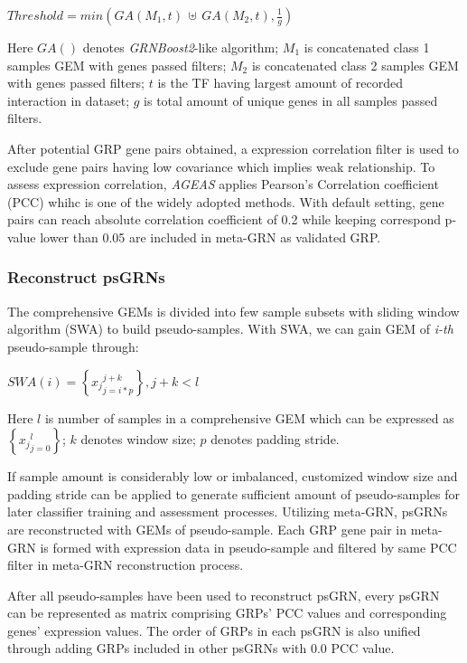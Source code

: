 \documentclass[fleqn,10pt]{wlscirep}
\begin{document}
      \centerline{$Threshold = min(GA(M_1, t)\, \uplus \, GA(M_2, t), \frac{1}{g})$}

      \noindent Here $GA()$ denotes \emph{GRNBoost2}\cite{grnboost2}-like algorithm;
      $M_1$ is concatenated class 1 samples GEM with genes passed filters;
      $M_2$ is concatenated class 2 samples GEM with genes passed filters;
      $t$ is the TF having largest amount of recorded interaction in dataset;
      $g$ is total amount of unique genes in all samples passed filters.

      After potential GRP gene pairs obtained, a expression correlation filter is used to exclude gene pairs having low covariance which implies weak relationship.
      To assess expression correlation, \emph{AGEAS} applies Pearson's Correlation coefficient\cite{pcc_2012} (PCC) whihc is one of the widely adopted methods\cite{cid_2019}.
      With default setting, gene pairs can reach absolute correlation coefficient of 0.2 while keeping correspond p-value lower than 0.05 are included in meta-GRN as validated GRP.

    \subsubsection*{Reconstruct psGRNs}
      The comprehensive GEMs is divided into few sample subsets with sliding window algorithm (SWA) to build pseudo-samples.
      With SWA, we can gain GEM of \emph{i-th} pseudo-sample through:

      \centerline{$SWA(i) = \left\{{x_j}_{j = i * p}^{j + k}\right\}, j + k < l$}

      \noindent Here $l$ is number of samples in a comprehensive GEM which can be expressed as $\left\{{x_j}_{j = 0}^{l}\right\}$; $k$ denotes window size; $p$ denotes padding stride.

      If sample amount is considerably low or imbalanced, customized window size and padding stride can be applied to generate sufficient amount of pseudo-samples for later classifier training and assessment processes.
      Utilizing meta-GRN, psGRNs are reconstructed with GEMs of pseudo-sample.
      Each GRP gene pair in meta-GRN is formed with expression data in pseudo-sample and filtered by same PCC filter in meta-GRN reconstruction process.

      After all pseudo-samples have been used to reconstruct psGRN, every psGRN can be represented as matrix comprising GRPs' PCC values and corresponding genes' expression values.
      The order of GRPs in each psGRN is also unified through adding GRPs included in other psGRNs with 0.0 PCC value.
\end{document}
